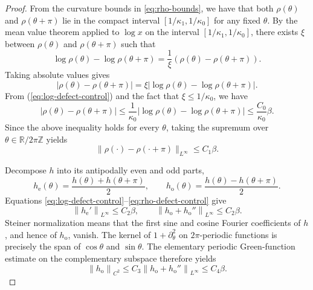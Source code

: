 \documentclass[12pt]{article}
\numberwithin{equation}{section}
\numberwithin{equation}{section}
\begin{document}
\begin{proof}
From the curvature bounds in \eqref{eq:rho-bounds}, we have that
both $\rho(\theta)$ and $\rho(\theta+\pi)$ lie in the compact interval
$\left[1/\kappa_1, 1/\kappa_0\right]$ for any fixed $\theta$.
By the mean value theorem applied to $\log x$ on the interval $\left[1/\kappa_1, 1/\kappa_0\right]$,
there exists $\xi$ between $\rho(\theta)$ and $\rho(\theta+\pi)$ such that
\[
\log \rho(\theta) - \log \rho(\theta+\pi) = \frac{1}{\xi}(\rho(\theta)-\rho(\theta+\pi)).
\]
Taking absolute values gives
\[
\left|\rho(\theta)-\rho(\theta+\pi)\right| = \xi |\log \rho(\theta) - \log \rho(\theta+\pi)|.
\]
From (\ref{eq:log-defect-control}) and the fact that $\xi \le 1/\kappa_0$,
we have
\begin{equation*}
|\rho(\theta)-\rho(\theta+\pi)| \le \frac{1}{\kappa_0} |\log \rho(\theta) - \log\rho(\theta+\pi)|\le \frac{C_0}{\kappa_0} \beta.
\end{equation*}
Since the above inequality holds for every $\theta$, taking the supremum over
$\theta \in \mathbb{R}/2\pi\mathbb{Z}$ yields
\begin{equation}\label{eq:rho-defect-control}
 \|\rho(\cdot)-\rho(\cdot+\pi)\|_{L^\infty}
 \leq C_1\beta.
\end{equation}

Decompose $h$ into its antipodally even and odd parts,
\[
 h_{\mathrm{e}}(\theta)=\frac{h(\theta)+h(\theta+\pi)}{2},
 \qquad
 h_{\mathrm{o}}(\theta)=\frac{h(\theta)-h(\theta+\pi)}{2}.
\]
Equations \eqref{eq:log-defect-control}--\eqref{eq:rho-defect-control}
give
\begin{equation}\label{eq:even-odd-control}
 \left\|h_{\mathrm{e}}'\right\|_{L^\infty}\leq C_2\beta,
 \qquad
 \left\|h_{\mathrm{o}}+h_{\mathrm{o}}''\right\|_{L^\infty}\leq C_2\beta.
\end{equation}
Steiner normalization means that the first sine and cosine Fourier
coefficients of $h$, and hence of $h_{\mathrm{o}}$, vanish. The kernel of
$1+\partial_\theta^2$ on $2\pi$-periodic functions is precisely the span of
$\cos\theta$ and $\sin\theta$. The elementary periodic Green-function
estimate on the complementary subspace therefore yields
\begin{equation}\label{eq:odd-C2-control}
 \left\|h_{\mathrm{o}}\right\|_{C^2}\leq
 C_3\left\|h_{\mathrm{o}}+h_{\mathrm{o}}''\right\|_{L^\infty}
 \leq C_4\beta.
\end{equation}


\end{proof}
\end{document}

